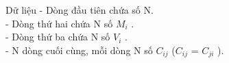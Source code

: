 Dữ liệu
- Dòng đầu tiên chứa số N.   
\\   - Dòng thứ hai chứa N số $M_{i}$   .   
\\   - Dòng thứ ba chứa N số $V_{i}$   .   
\\   - N dòng cuối cùng, mỗi dòng N số $C_{ij}$   ($C_{ij}$   = $C_{ji}$   ).